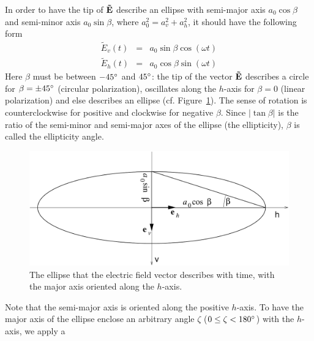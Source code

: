 In order to have the tip of $\mathbf{\tilde{E}}$ describe an ellipse with semi-major axis $a_0 \cos\beta$
and
semi-minor axis $a_0 \sin\beta$, where $a_0^2 = a_v^2 + a_h^2$, 
it should have the following form
\begin{eqnarray}
  \label{eq:polarization:ellipse_parallel}
 \tilde{E}_v (t) &=&   a_0 \sin\beta \cos(\omega t)\\
 \tilde{E}_h (t) &=&   a_0 \cos\beta \sin(\omega t)
\end{eqnarray}
Here $\beta$ must be between $-45^\circ$ and $45^\circ$: the tip of
the vector $\mathbf{\tilde{E}}$ describes a circle for $\beta = \pm
45^\circ$ (circular polarization), oscillates along the $h$-axis for
$\beta = 0$ (linear polarization) and else describes an ellipse (cf.
Figure~\ref{fig:polarization:ellipse_aligned}). The sense of rotation
is counterclockwise for positive and clockwise for negative $\beta$.
Since $|\tan\beta|$ is the ratio of the semi-minor and semi-major axes
of the ellipse (the ellipticity), $\beta$ is called the ellipticity
angle.
\begin{figure}[!h]
 \begin{center}
  \begin{minipage}[c]{0.9\textwidth}
   \begin{center}
    \includegraphics*[width=0.9\hsize]{Figs/pol_ellipse_aligned}
   \end{center}
  \end{minipage}
  \begin{minipage}[c]{0.9\textwidth}
   \caption{The ellipse that the electric field vector describes with
     time, with the major axis oriented along the $h$-axis.}
   \label{fig:polarization:ellipse_aligned}
  \end{minipage}
 \end{center}
\end{figure}   
Note that the semi-major axis is oriented along the positive $h$-axis.
To have the major axis of the ellipse enclose an arbitrary angle
$\zeta$ ($0 \leq \zeta < 180^\circ$) with the $h$-axis, we apply a
